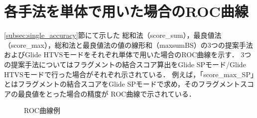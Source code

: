 \chapter{各手法を単体で用いた場合のROC曲線}\label{appendix:roc}
\ref{subsec:single_accuracy}節にて示した
総和法（score\_sum），最良値法（score\_max），総和法と最良値法の値の線形和（maxsumBS）の3つの提案手法
およびGlide HTVSモードをそれぞれ単体で用いた場合のROC曲線を示す．
3つの提案手法についてはフラグメントの結合スコア算出をGlide SPモード/Glide HTVSモードで行った場合がそれぞれ示されている．
例えば，「score\_max\_SP」とはフラグメントの結合スコアをGlide SPモードで求め，そのフラグメントスコアの最良値をとった場合の精度が
ROC曲線で示されている．
\begin{figure}[tb]
 \begin{minipage}{0.5\hsize}
  \begin{center}
  \end{center}
 \end{minipage}
 \begin{minipage}{0.5\hsize}
  \begin{center}
  \end{center}
 \end{minipage}
 \begin{minipage}{0.5\hsize}
  \begin{center}
  \end{center}
 \end{minipage}
 \begin{minipage}{0.5\hsize}
  \begin{center}
  \end{center}
 \end{minipage}
 \begin{minipage}{0.5\hsize}
  \begin{center}
  \end{center}
 \end{minipage}
 \begin{minipage}{0.5\hsize}
  \begin{center}
  \end{center}
 \end{minipage}
  \caption{ROC曲線例}
  \label{fig:roc:1}
\end{figure}

